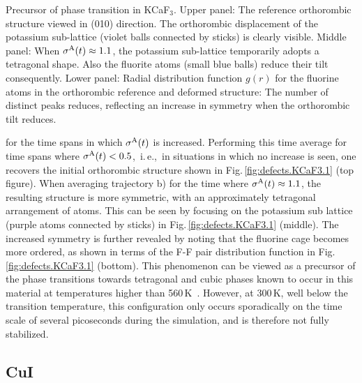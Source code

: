 \begin{marginfigure}[-3cm]
	\caption{Precursor of phase transition in KCaF$_3$. Upper panel: The reference orthorombic structure viewed in (010) direction. The orthorombic displacement of the potassium sub-lattice (violet balls connected by sticks) is clearly visible. Middle panel: When $\sigma^\mathrm{A} (t) \approx 1.1$, the potassium sub-lattice temporarily adopts a tetragonal shape. Also the fluorite atoms (small blue balls) reduce their tilt consequently. Lower panel: Radial distribution function $g(r)$ for the fluorine atoms in the orthorombic reference and deformed structure: The number of distinct peaks reduces, reflecting an increase in symmetry when the orthorombic tilt reduces.}
	\label{fig:defects.KCaF3.1}
\end{marginfigure}
\noindent
for the time spans in which $\sigma^\mathrm{A} (t)$ is increased. Performing this time average for time spans where $\sigma^\mathrm{A} (t) < 0.5$,~i.\,e.,~in situations in which no increase is seen, one recovers the initial orthorombic structure shown in Fig.\,\ref{fig:defects.KCaF3.1} (top figure). When averaging trajectory b) for the time where $\sigma^\mathrm{A} (t) \approx 1.1$, the resulting structure is more symmetric, with an approximately tetragonal arrangement of atoms. This can be seen by focusing on the potassium sub lattice (purple atoms connected by sticks) in Fig.\,\ref{fig:defects.KCaF3.1} (middle). The increased symmetry is further revealed by noting that the fluorine cage becomes more ordered, as shown in terms of the F-F pair distribution function in Fig.\,\ref{fig:defects.KCaF3.1} (bottom). This phenomenon can be viewed as a precursor of the phase transitions towards tetragonal and cubic phases known to occur in this material at temperatures higher than 560\,K~\cite{Bulou.1980,Hidaka.1984,Knoop.2020}. However, at 300\,K, well below the transition temperature, this configuration only occurs sporadically on the time scale of several picoseconds during the simulation, and is therefore not fully stabilized.



\subsection{CuI}
\label{sec:defects.CuI}

